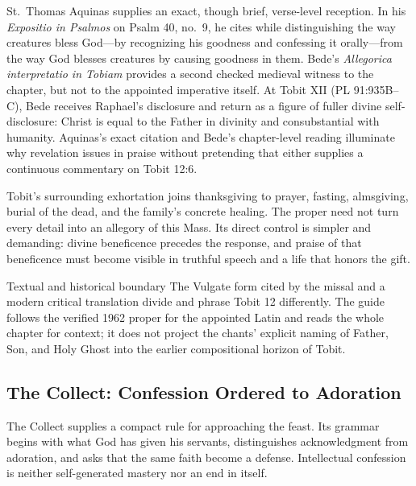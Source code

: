 \begin{deepstudy}
St.~Thomas Aquinas supplies an exact, though brief, verse-level reception. In his \emph{Expositio in Psalmos} on Psalm 40, no.~9, he cites  while distinguishing the way creatures bless God---by recognizing his goodness and confessing it orally---from the way God blesses creatures by causing goodness in them. Bede's \emph{Allegorica interpretatio in Tobiam} provides a second checked medieval witness to the chapter, but not to the appointed imperative itself. At Tobit XII (PL 91:935B--C), Bede receives Raphael's disclosure and return as a figure of fuller divine self-disclosure: Christ is equal to the Father in divinity and consubstantial with humanity. Aquinas's exact citation and Bede's chapter-level reading illuminate why revelation issues in praise without pretending that either supplies a continuous commentary on Tobit 12:6.

Tobit's surrounding exhortation joins thanksgiving to prayer, fasting, almsgiving, burial of the dead, and the family's concrete healing. The proper need not turn every detail into an allegory of this Mass. Its direct control is simpler and demanding: divine beneficence precedes the response, and praise of that beneficence must become visible in truthful speech and a life that honors the gift.

\begin{studybox}{Textual and historical boundary}
The Vulgate form cited by the missal and a modern critical translation divide and phrase Tobit 12 differently. The guide follows the verified 1962 proper for the appointed Latin and reads the whole chapter for context; it does not project the chants' explicit naming of Father, Son, and Holy Ghost into the earlier compositional horizon of Tobit.
\end{studybox}

\sectionguard
\subsection*{The Collect: Confession Ordered to Adoration\enspace{}}

The Collect supplies a compact rule for approaching the feast. Its grammar begins with what God has given his servants, distinguishes acknowledgment from adoration, and asks that the same faith become a defense. Intellectual confession is neither self-generated mastery nor an end in itself.


\end{deepstudy}

